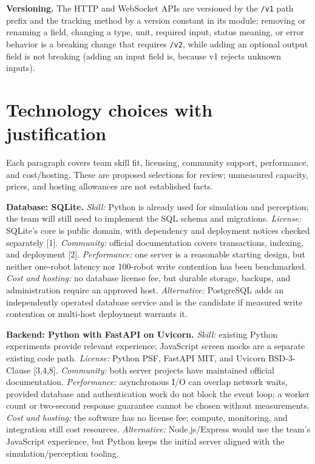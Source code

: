 \documentclass[12pt,letterpaper]{article}
\newcommand{\field}[1]{\texttt{#1}}
\begin{document}
\textbf{Versioning.} The HTTP and WebSocket APIs are versioned by the \field{/v1} path prefix and the tracking method by a version constant in its module; removing or renaming a field, changing a type, unit, required input, status meaning, or error behavior is a breaking change that requires \field{/v2}, while adding an optional output field is not breaking (adding an input field is, because v1 rejects unknown inputs).

\section{Technology choices with justification}

Each paragraph covers team skill fit, licensing, community support, performance, and cost/hosting. These are proposed selections for review; unmeasured capacity, prices, and hosting allowances are not established facts.

\textbf{Database: SQLite.} \emph{Skill:} Python is already used for simulation and perception; the team will still need to implement the SQL schema and migrations. \emph{License:} SQLite's core is public domain, with dependency and deployment notices checked separately [1]. \emph{Community:} official documentation covers transactions, indexing, and deployment [2]. \emph{Performance:} one server is a reasonable starting design, but neither one-robot latency nor 100-robot write contention has been benchmarked. \emph{Cost and hosting:} no database license fee, but durable storage, backups, and administration require an approved host. \emph{Alternative:} PostgreSQL adds an independently operated database service and is the candidate if measured write contention or multi-host deployment warrants it.

\textbf{Backend: Python with FastAPI on Uvicorn.} \emph{Skill:} existing Python experiments provide relevant experience; JavaScript screen mocks are a separate existing code path. \emph{License:} Python PSF, FastAPI MIT, and Uvicorn BSD-3-Clause [3,4,8]. \emph{Community:} both server projects have maintained official documentation. \emph{Performance:} asynchronous I/O can overlap network waits, provided database and authentication work do not block the event loop; a worker count or two-second response guarantee cannot be chosen without measurements. \emph{Cost and hosting:} the software has no license fee; compute, monitoring, and integration still cost resources. \emph{Alternative:} Node.js/Express would use the team's JavaScript experience, but Python keeps the initial server aligned with the simulation/perception tooling.
\end{document}
